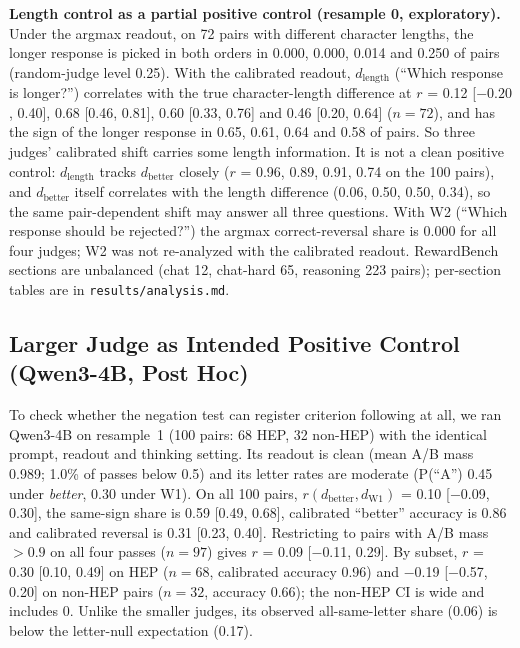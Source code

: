 \documentclass[conference]{IEEEtran}
\begin{document}
\textbf{Length control as a partial positive control (resample 0, exploratory).} Under the argmax readout, on
72 pairs with different character lengths, the longer response is picked in both orders in 0.000, 0.000, 0.014
and 0.250 of pairs (random-judge level 0.25). With the calibrated readout, $d_\mathrm{length}$ (``Which response
is longer?'') correlates with the true character-length difference at $r$ = 0.12 [$-0.20$, 0.40], 0.68 [0.46,
0.81], 0.60 [0.33, 0.76] and 0.46 [0.20, 0.64] ($n=72$), and has the sign of the longer response in 0.65, 0.61,
0.64 and 0.58 of pairs. So three judges' calibrated shift carries some length information. It is not a clean
positive control: $d_\mathrm{length}$ tracks $d_\mathrm{better}$ closely ($r$ = 0.96, 0.89, 0.91, 0.74 on the
100 pairs), and $d_\mathrm{better}$ itself correlates with the length difference (0.06, 0.50, 0.50, 0.34), so the
same pair-dependent shift may answer all three questions. With W2 (``Which response should be rejected?'') the
argmax correct-reversal share is 0.000 for all four judges; W2 was not re-analyzed with the calibrated readout.
RewardBench sections are unbalanced (chat 12, chat-hard 65, reasoning 223 pairs); per-section tables are in
\texttt{results/analysis.md}.

\subsection{Larger Judge as Intended Positive Control (Qwen3-4B, Post Hoc)}\label{sec:pc}
To check whether the negation test can register criterion following at all, we ran Qwen3-4B on resample~1
(100 pairs: 68 HEP, 32 non-HEP) with the identical prompt, readout and thinking setting. Its readout is clean
(mean A/B mass 0.989; 1.0\% of passes below 0.5) and its letter rates are moderate (P(``A'') 0.45 under
\emph{better}, 0.30 under W1). On all 100 pairs, $r(d_\mathrm{better}, d_\mathrm{W1})$ = 0.10 [$-$0.09, 0.30],
the same-sign share is 0.59 [0.49, 0.68], calibrated ``better'' accuracy is 0.86 and calibrated reversal is
0.31 [0.23, 0.40]. Restricting to pairs with A/B mass $>0.9$ on all four passes ($n=97$) gives $r$ = 0.09
[$-$0.11, 0.29]. By subset, $r$ = 0.30 [0.10, 0.49] on HEP ($n=68$, calibrated accuracy 0.96) and $-$0.19
[$-$0.57, 0.20] on non-HEP pairs ($n=32$, accuracy 0.66); the non-HEP CI is wide and includes 0. Unlike the
smaller judges, its observed all-same-letter share (0.06) is below the letter-null expectation (0.17).
\end{document}
